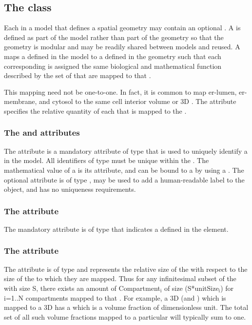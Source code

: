 \subsection{The  class}
\label{compartmentmapping-class}
Each \Compartment in a model that defines a spatial geometry may contain an optional \CompartmentMapping. A \CompartmentMapping is defined as part of the model rather than part of the geometry so that the geometry is modular and may be readily shared between models and reused.  A \CompartmentMapping maps a \Compartment defined in the model to a \DomainType defined in the geometry such that each corresponding \DomainType is assigned the same biological and mathematical function described by the set of \Compartments that are mapped to that \DomainType. 

This mapping need not be one-to-one.  In fact, it is common to map er-lumen, er-membrane, and cytosol to the same cell interior volume or 3D \DomainType.  The  attribute specifies the relative quantity of each \Compartment that is mapped to the \DomainType.

\subsubsection{The \fixttspace{} and \fixttspace{} attributes}
The  attribute is a mandatory attribute of type  that is used to uniquely identify a \CompartmentMapping in the model.  All identifiers of type  must be unique within the \Geometry.  The mathematical value of a \CompartmentMapping is its  attribute, and can be bound to a \Parameter by using a \SpatialSymbolReference.  The optional  attribute is of type , may be used to add a human-readable label to the object, and has no uniqueness requirements.

\subsubsection{The \fixttspace{} attribute}
The mandatory  attribute is of type  that indicates a \DomainType defined in the \Geometry element.

\subsubsection{The \fixttspace{} attribute}
The  attribute is of type  and represents the relative size of the \Compartment with respect to the size of the \Domains to which they are mapped.  Thus for any infinitesimal subset of the \Domain with size S, there exists an amount of Compartment$_{\text{i}}$ of size (S*unitSize$_{\text{i}}$) for i=1..N compartments mapped to that \DomainType.  For example, a 3D \Compartment (and \DomainType) which is mapped to a 3D \DomainType has a  which is a volume fraction of dimensionless unit.  The total set of all such volume fractions mapped to a particular \DomainType will typically sum to one. 

